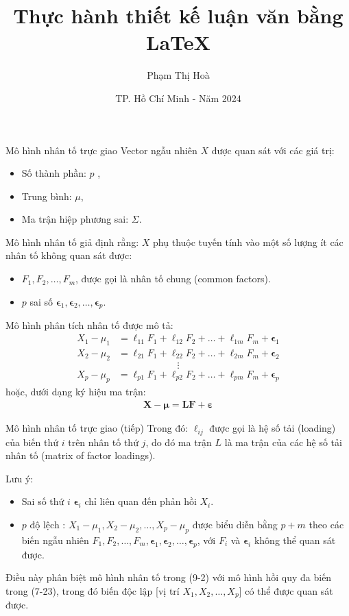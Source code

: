 \documentclass{beamer}
\title[Thực hành thiết kế luận văn bằng \LaTeX]{Thực hành thiết kế luận văn bằng \LaTeX}
\author[Phạm Thị Hoà]{Phạm Thị Hoà}
\institute[ĐHQG-HCM]{Đại học Quốc gia TP. HCM}
\date[2024]{TP. Hồ Chí Minh - Năm 2024}
\begin{document}
\begin{frame}
  \titlepage
\end{frame}

\begin{frame}{Mô hình nhân tố trực giao}
Vector ngẫu nhiên \(X\) được quan sát với các giá trị:
\begin{itemize}
\item Số thành phần: \(p\) ,
\item Trung bình: \(\mu\),
\item Ma trận hiệp phương sai: \(\Sigma\).
\end{itemize}
Mô hình nhân tố giả định rằng: \(X\) phụ thuộc tuyến tính vào một số lượng ít các nhân tố không quan sát được:
\begin{itemize}
\item \(F_1, F_2, \ldots, F_m\), được gọi là nhân tố chung (common factors).
\item \(p\) sai số  \(\boldsymbol{\epsilon}_1, \boldsymbol{\epsilon}_2, \ldots, \boldsymbol{\epsilon}_p\).
\end{itemize}
Mô hình phân tích nhân tố được mô tả:
\begin{eqnarray}
X_1 - \mu_1 &= \ell_{11}F_1 + \ell_{12}F_2 + \ldots + \ell_{1m}F_m + \boldsymbol{\epsilon}_1\\
X_2 - \mu_2 &= \ell_{21}F_1 + \ell_{22}F_2 + \ldots + \ell_{2m}F_m + \boldsymbol{\epsilon}_2
\end{eqnarray}
\[\vdots\]
\begin{eqnarray}
X_p - \mu_p &= \ell_{p1}F_1 + \ell_{p2}F_2 + \ldots + \ell_{pm}F_m + \boldsymbol{\epsilon}_p
\end{eqnarray}
hoặc, dưới dạng ký hiệu ma trận:
\begin{eqnarray}
\mathbf{X} - \boldsymbol{\mu} = \mathbf{L}\mathbf{F} + \boldsymbol{\varepsilon}
\end{eqnarray}
\end{frame}

\begin{frame}{Mô hình nhân tố trực giao (tiếp)}
Trong đó: \(\ell_{ij}\) được gọi là hệ số tải (loading) của biến thứ \(i\) trên nhân tố thứ \(j\), do đó ma trận \(L\) là ma trận của các hệ số tải nhân tố (matrix of factor loadings).

Lưu ý: 
\begin{itemize}
    \item Sai số thứ \(i\) \(\boldsymbol{\epsilon}_i\) chỉ liên quan đến phản hồi \(X_i\).
    \item \(p\) độ lệch : \(X_1 - \mu_1, X_2 - \mu_2, \ldots, X_p - \mu_p\) được biểu diễn bằng \(p + m\) theo các biến ngẫu nhiên  \(F_1, F_2, \ldots, F_m, \boldsymbol{\epsilon}_1, \boldsymbol{\epsilon}_2, \ldots, \boldsymbol{\epsilon}_p\), với \(F_i\) và \(\boldsymbol{\epsilon}_i\) không thể quan sát được.
\end{itemize}
Điều này phân biệt mô hình nhân tố trong (9-2) với mô hình hồi quy đa biến trong (7-23), trong đó biến độc lập [vị trí \(X_1, X_2, \ldots, X_p\)] có thể được quan sát được.
\end{frame}
\end{document}
